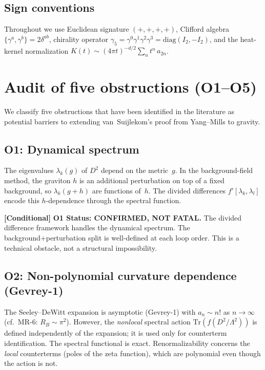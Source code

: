 \documentclass[11pt,a4paper]{article}
\newcommand{\Tr}{\mathrm{Tr}}
\theoremstyle{definition}
\newcommand{\condbox}[1]{%
  \par\smallskip\noindent
  \colorbox{yellow!10}{\parbox{\dimexpr\linewidth-2\fboxsep}{%
    \textcolor{conditional}{\textbf{[Conditional]}} #1}}%
  \par\smallskip}
\begin{document}
\subsection{Sign conventions}

Throughout we use Euclidean signature $(+,+,+,+)$, Clifford algebra
$\{\gamma^a, \gamma^b\} = 2\delta^{ab}$, chirality operator
$\gamma_5 = \gamma^0\gamma^1\gamma^2\gamma^3 = \mathrm{diag}(I_2, -I_2)$,
and the heat-kernel normalization
$K(t) \sim (4\pi t)^{-d/2} \sum_n t^n\, a_{2n}$.


\section{Audit of five obstructions (O1--O5)}\label{sec:obstructions}

We classify five obstructions that have been identified in the literature as
potential barriers to extending van~Suijlekom's proof from Yang--Mills to
gravity.

\subsection{O1: Dynamical spectrum}\label{sec:O1}

The eigenvalues $\lambda_k(g)$ of $D^2$ depend on the metric~$g$.  In the
background-field method, the graviton $h$ is an additional perturbation on top
of a fixed background, so $\lambda_k(g + h)$ are functions of~$h$.  The
divided differences $f'[\lambda_k, \lambda_l]$ encode this $h$-dependence
through the spectral function.

\condbox{%
  \textbf{O1 Status: CONFIRMED, NOT FATAL.}
  The divided difference framework handles the dynamical spectrum.  The
  background+perturbation split is well-defined at each loop order.  This is a
  technical obstacle, not a structural impossibility.}

\subsection{O2: Non-polynomial curvature dependence (Gevrey-1)}\label{sec:O2}

The Seeley--DeWitt expansion is asymptotic (Gevrey-1) with $a_n \sim n!$ as
$n \to \infty$ (cf.\ MR-6: $R_B \sim \pi^2$).  However, the \emph{nonlocal}
spectral action $\Tr(f(D^2/\Lambda^2))$ is defined independently of the
expansion; it is used only for counterterm identification.  The spectral
functional is exact.  Renormalizability concerns the \emph{local} counterterms
(poles of the zeta function), which are polynomial even though the action is
not.
\end{document}
